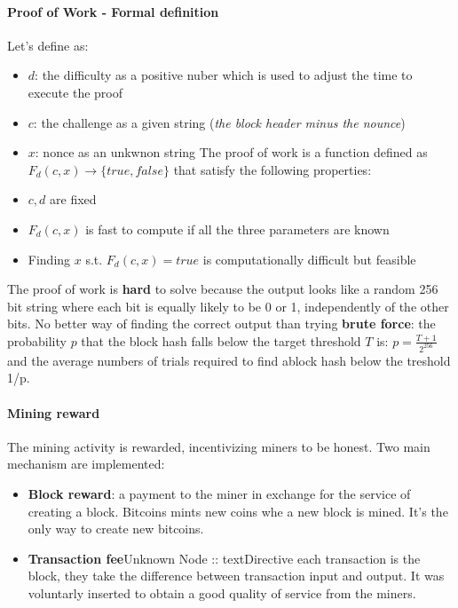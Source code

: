 \documentclass[10pt,a4paper]{report}
\begin{document}
\paragraph{Proof of Work - Formal definition}\label{sec:proof-of-work---formal-definition}
Let's define as:
\begin{itemize}
	\item 
	$d$: the difficulty as a positive nuber which is used to adjust the time to execute the proof
	\item 
	$c$: the challenge as a given string (\textit{the block header minus the nounce})
	\item 
	$x$: nonce as an unkwnon string
	The proof of work is a function defined as $F_{d}(c,x) \rightarrow \{true,false\}$ that satisfy the following properties:
	\item 
	$c,d$ are fixed
	\item 
	$F_{d}(c,x)$ is fast to compute if all the three parameters are known
	\item 
	Finding $x$ s.t. $F_{d}(c,x)=true$ is computationally difficult but feasible
	
\end{itemize}

The proof of work is \textbf{hard} to solve because the output looks like a random 256 bit string where each bit is equally likely to be 0 or 1, independently of the other bits. No better way of finding the correct output than trying \textbf{brute force}: the probability $p$ that the block hash falls below the target threshold $T$ is:
$p = \frac{T+1}{2^{256}}$
and the average numbers of trials required to find ablock hash below the treshold 1/p.
\paragraph{Mining reward}\label{sec:mining-reward}
The mining activity is rewarded, incentivizing miners to be honest. Two main mechanism are implemented:
\begin{itemize}
	\item 
	\textbf{Block reward}: a payment to the miner in exchange for the service of creating a block. Bitcoins mints new coins whe a new block is mined. It's the only way to create new bitcoins.
	\item 
	\textbf{Transaction fee}Unknown Node :: textDirective
	each transaction is the block, they take the difference between transaction input and output. It was voluntarly inserted to obtain a good quality of service from the miners.
\end{itemize}
\end{document}

